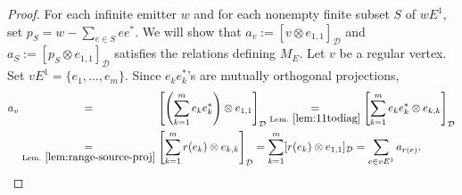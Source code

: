 \documentclass[11pt, letterpaper,final]{amsart}
\newcommand{\D}{\mathcal{D}}
\theoremstyle{definition}
\theoremstyle{remark}
\begin{document}
\begin{proof}
For each infinite emitter $w$ and for each nonempty finite subset $S$ of $wE^1$, set $p_{S} = w - \sum_{ e\in S} e e^*$.  We will show that $a_v:=  [ v \otimes e_{1,1} ]_{ \D } $ and $a_S:= [p_S\otimes e_{1,1} ]_{\D }$ satisfies the relations defining $M_E$.  Let $v$ be a regular vertex.  Set $vE^1 = \{ e_1, \ldots, e_m \}$. 
 Since $e_k e_k^*$'s are mutually orthogonal projections, 
\begin{align*}
a_v &\underset{\phantom{\text{Lem.}~\ref{lem:range-source-proj}}}{=} \left[ \left( \sum_{k=1}^m e_k e_k^* \right) \otimes e_{1,1} \right]_{ \D  } \underset{\text{Lem.}~\ref{lem:11todiag}}{=} \left[ \sum_{ k=1}^m e_k e_k^* \otimes e_{k, k}  \right]_{ \D  } \\
&\underset{\text{Lem.}~\ref{lem:range-source-proj}}{=} \left[ \sum_{ k=1}^m r(e_k) \otimes e_{k,k} \right]_{ \D  } = \sum_{ k = 1}^m [ r(e_k) \otimes e_{1,1}]_{ \D  } = \sum_{ e \in vE^1} a_{r(e)}.
\end{align*}


\end{proof}
\end{document}
